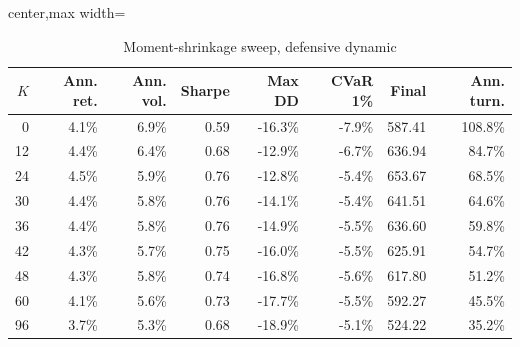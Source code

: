 \begin{table}[!htbp]
\centering
\caption{Moment-shrinkage sweep, defensive dynamic}
\label{tab:allocation-moment-shrinkage-defensive}
\small
\setlength{\tabcolsep}{5pt}
\renewcommand{\arraystretch}{1.12}
\begin{adjustbox}{center,max width=\linewidth}
\begin{tabular}{rrrrrrrr}
\toprule
$K$ & Ann. ret. & Ann. vol. & Sharpe & Max DD & CVaR 1\% & Final & Ann. turn. \\
\midrule
0 & 4.1\% & 6.9\% & 0.59 & -16.3\% & -7.9\% & 587.41 & 108.8\% \\
12 & 4.4\% & 6.4\% & 0.68 & -12.9\% & -6.7\% & 636.94 & 84.7\% \\
24 & 4.5\% & 5.9\% & 0.76 & -12.8\% & -5.4\% & 653.67 & 68.5\% \\
30 & 4.4\% & 5.8\% & 0.76 & -14.1\% & -5.4\% & 641.51 & 64.6\% \\
36 & 4.4\% & 5.8\% & 0.76 & -14.9\% & -5.5\% & 636.60 & 59.8\% \\
42 & 4.3\% & 5.7\% & 0.75 & -16.0\% & -5.5\% & 625.91 & 54.7\% \\
48 & 4.3\% & 5.8\% & 0.74 & -16.8\% & -5.6\% & 617.80 & 51.2\% \\
60 & 4.1\% & 5.6\% & 0.73 & -17.7\% & -5.5\% & 592.27 & 45.5\% \\
96 & 3.7\% & 5.3\% & 0.68 & -18.9\% & -5.1\% & 524.22 & 35.2\% \\
\bottomrule
\end{tabular}
\end{adjustbox}
\end{table}